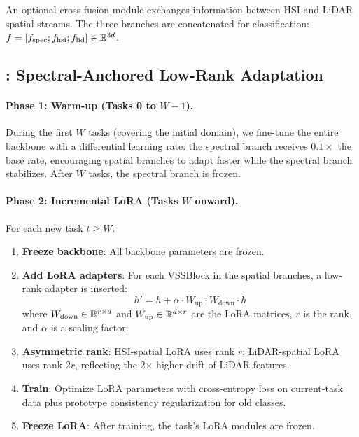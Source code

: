 An optional cross-fusion module exchanges information between HSI and LiDAR spatial streams. The three branches are concatenated for classification: $f = [f_{\mathrm{spec}}; f_{\mathrm{hsi}}; f_{\mathrm{lid}}] \in \mathbb{R}^{3d}$.

\subsection{\methodname{}: Spectral-Anchored Low-Rank Adaptation}
\label{sec:anchorlora}

\paragraph{Phase 1: Warm-up (Tasks 0 to $W{-}1$).}
During the first $W$ tasks (covering the initial domain), we fine-tune the entire \backbonename{} backbone with a differential learning rate: the spectral branch receives $0.1\times$ the base rate, encouraging spatial branches to adapt faster while the spectral branch stabilizes. After $W$ tasks, the spectral branch is frozen.

\paragraph{Phase 2: Incremental LoRA (Tasks $W$ onward).}
For each new task $t \geq W$:
\begin{enumerate}
    \item \textbf{Freeze backbone}: All backbone parameters are frozen.
    \item \textbf{Add LoRA adapters}: For each VSSBlock in the spatial branches, a low-rank adapter is inserted:
    \begin{equation}
        h' = h + \alpha \cdot W_{\text{up}} \cdot W_{\text{down}} \cdot h
    \end{equation}
    where $W_{\text{down}} \in \mathbb{R}^{r \times d}$ and $W_{\text{up}} \in \mathbb{R}^{d \times r}$ are the LoRA matrices, $r$ is the rank, and $\alpha$ is a scaling factor.
    \item \textbf{Asymmetric rank}: HSI-spatial LoRA uses rank $r$; LiDAR-spatial LoRA uses rank $2r$, reflecting the 2$\times$ higher drift of LiDAR features.
    \item \textbf{Train}: Optimize LoRA parameters with cross-entropy loss on current-task data plus prototype consistency regularization for old classes.
    \item \textbf{Freeze LoRA}: After training, the task's LoRA modules are frozen.
\end{enumerate}


